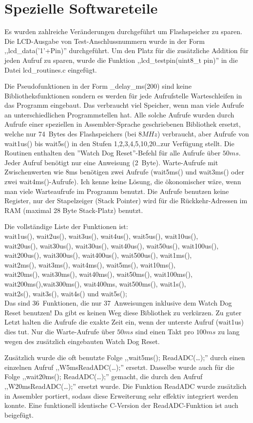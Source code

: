 
\chapter{Spezielle Softwareteile}

Es wurden zahlreiche Veränderungen durchgeführt um Flashspeicher zu sparen.
Die LCD-Ausgabe von Test-Anschlussnummern wurde in der Form ,,lcd\_data('1'+Pin)'' durchgeführt.
Um den Platz für die zusätzliche Addition für jeden Aufruf zu sparen, wurde die
Funktion ,,lcd\_testpin(uint8\_t pin)'' in die Datei lcd\_routines.c eingefügt.


Die Pseudofunktionen in der Form \_delay\_ms(200) sind keine Bibliotheksfunktionen
sondern es werden für jede Aufrufstelle Warteschleifen in das Programm eingebaut.
Das verbraucht viel Speicher, wenn man viele Aufrufe an unterschiedlichen Programmstellen hat.
Alle solche Aufrufe wurden durch Aufrufe einer speziellen in Assembler-Sprache geschriebenen
Bibliothek ersetzt, welche nur 74~Bytes des Flashspeichers (bei \(8MHz\)) verbraucht, aber
Aufrufe von wait1us() bis wait5s() in den Stufen 1,2,3,4,5,10,20\dots zur Verfügung stellt.
Die Routinen enthalten den ''Watch Dog Reset''-Befehl für alle Aufrufe über \(50ms\).
Jeder Aufruf benötigt nur eine Anweisung (2~Byte). Warte-Aufrufe mit Zwischenwerten
wie 8ms benötigen zwei Aufrufe (wait5ms() und wait3ms() oder zwei wait4ms()-Aufrufe).
Ich kenne keine Lösung, die ökonomischer wäre, wenn man viele Warteaufrufe im Programm benutzt.
Die Aufrufe benutzen keine Register, nur der Stapelzeiger (Stack Pointer) wird für die Rückkehr-Adressen
im RAM (maximal 28 Byte Stack-Platz) benutzt.

Die vollständige Liste der Funktionen ist:\\
wait1us(), wait2us(), wait3us(), wait4us(), wait5us(), wait10us(), \\
wait20us(), wait30us(), wait30us(), wait40us(), wait50us(), wait100us(), \\
wait200us(), wait300us(), wait400us(), wait500us(), wait1ms(),\\
wait2ms(), wait3ms(), wait4ms(), wait5ms(), wait10ms(),\\
wait20ms(), wait30ms(), wait40ms(), wait50ms(), wait100ms(),\\
wait200ms(),wait300ms(), wait400ms, wait500ms(), wait1s(),\\
wait2s(), wait3s(), wait4s() und wait5s();\\
Das sind 36~Funktionen, die nur 37~Anweisungen inklusive dem Watch Dog Reset benutzen!
Da gibt es keinen Weg diese Bibliothek zu verkürzen.
Zu guter Letzt halten die Aufrufe die exakte Zeit ein, wenn der unterste Aufruf (wait1us) dies tut.
Nur die Warte-Aufrufe über \(50ms\) sind einen Takt pro \(100ms\) zu lang wegen des zusätzlich eingebauten
Watch Dog Reset.


Zusätzlich wurde die oft benutzte Folge ,,wait5ms(); ReadADC(\dots);'' durch einen einzelnen Aufruf
,,W5msReadADC(\dots);'' ersetzt.
Dasselbe wurde auch für die Folge ,,wait20ms(); ReadADC(\dots);'' gemacht, die durch den Aufruf
,,W20msReadADC(\dots);'' ersetzt wurde.
Die Funktion ReadADC wurde zusätzlich in Assembler portiert, sodass diese Erweiterung
sehr effektiv integriert werden konnte.
Eine funktionell identische C-Version der ReadADC-Funktion ist auch beigefügt.
